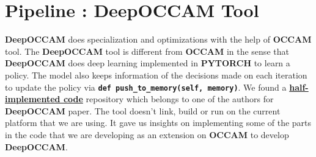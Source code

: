 \documentclass{article} %
\begin{document}
\section*{\color{darkmidnightblue} Pipeline : DeepOCCAM Tool} \textbf{DeepOCCAM} does specialization and optimizations with the help of \textbf{OCCAM} tool. The \textbf{DeepOCCAM} tool is different from \textbf{OCCAM} in the sense that \textbf{DeepOCCAM} does deep learning implemented in \textbf{PYTORCH} to learn a policy. The model also keeps information of the decisions made on each iteration to update the policy via \textbf{\texttt{def push\_to\_memory(self, memory)}}. We found a \textbf{\href{https://github.com/nhamlv-55/OCCAM/tree/mlpolicy}{half-implemented code}} repository which belongs to one of the authors for \textbf{DeepOCCAM} paper. The tool doesn't link, build or run on the current platform that we are using. It gave us insights on implementing some of the parts in the code that we are developing as an extension on \textbf{OCCAM} to develop \textbf{DeepOCCAM}.
\end{document}

